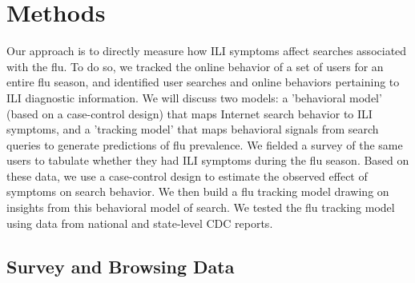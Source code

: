 \documentclass[fleqn,10pt]{wlscirep}
\begin{document}




\section*{Methods}

Our approach is to directly measure how ILI symptoms affect searches associated with the flu. To do so, we tracked the online behavior of a set of users for an entire flu season, and identified user searches and online behaviors pertaining to ILI diagnostic information. We will discuss two models: a 'behavioral model' (based on a case-control design) that maps Internet search behavior to ILI symptoms, and a 'tracking model' that maps behavioral signals from search queries to generate predictions of flu prevalence. We fielded a survey of the same users to tabulate whether they had ILI symptoms during the flu season. Based on these data, we use a case-control design to estimate the observed effect of symptoms on search behavior. We then build a flu tracking model drawing on insights from this behavioral model of search. We tested the flu tracking model using data from national and state-level CDC reports.

\subsection*{Survey and Browsing Data}
\end{document}
